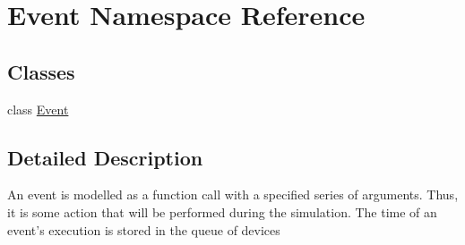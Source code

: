 \hypertarget{namespace_event}{}\section{Event Namespace Reference}
\label{namespace_event}
\subsection*{Classes}
\begin{DoxyCompactItemize}
\item 
class \hyperlink{class_event_1_1_event}{Event}
\end{DoxyCompactItemize}


\subsection{Detailed Description}
\begin{DoxyVerb}An event is modelled as a function call with a specified series of arguments.
Thus, it is some action that will be performed during the simulation.
The time of an event's execution is stored in the queue of devices\end{DoxyVerb}
 